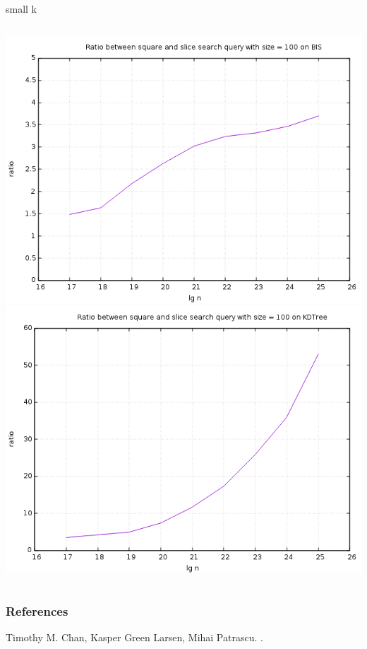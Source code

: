 \documentclass[pdf]{beamer}
\begin{document}
\begin{frame}{small k}
  \begin{columns}
    \includegraphics[scale=0.32]{pictures/analysis/smalls/bis_ratio_100.png}
    \includegraphics[scale=0.32]{pictures/analysis/smalls/kdtree_ratio_100.png}
  \end{columns}
\end{frame}



\begin{frame}[allowframebreaks]
  \frametitle<presentation>{References}
    
  \begin{thebibliography}{10}
    
  \beamertemplatebookbibitems

    Timothy M. Chan, Kasper Green Larsen, Mihai Patrascu.
    .
 \end{thebibliography}
\end{frame}
\end{document}
